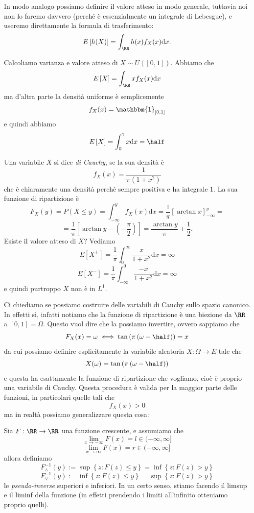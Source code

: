 \documentclass[11pt]{scrartcl}
\newcommand{\dif}{\text{d}}
\begin{document}
	In modo analogo possiamo definire il valore atteso in modo generale, tuttavia noi non lo faremo davvero (perché è essenzialmente un integrale di Lebesgue), e useremo direttamente la formula di trasferimento:
	$$E\left[h(X)\right]=\int_\RR h(x)f_X(x)\dif x.$$
	\begin{example}[Uniforme]
		Calcoliamo varianza e valore atteso di $X\sim U([0,1])$. Abbiamo che
		$$E\left[X\right]=\int_\RR xf_X(x)\dif x$$
		ma d'altra parte la densità uniforme è semplicemente
		$$f_X(x)=\mathbbm{1}_{[0,1]}$$
		e quindi abbiamo
		$$E\left[X\right]=\int_0^1 x\dif x=\half$$
	\end{example}
	\begin{example}
		Una variabile $X$ si dice \textit{di Cauchy}, se la sua densità è
		$$f_X(x)=\frac{1}{\pi(1+x^2)}$$
		che è chiaramente una densità perchè sempre positiva e ha integrale $1$. La sua funzione di ripartizione è
		$$F_X(y)=P\left(X\le y\right)=\int_{-\infty}^y f_X(x)\dif x=\frac{1}{\pi}\left[\arctan x\right]_{-\infty}^y=$$
		$$=\frac{1}{\pi}\left[\arctan y-\left(-\frac{\pi}{2}\right)\right]=\frac{\arctan y}{\pi}+\frac{1}{2}.$$
		Esiste il valore atteso di $X$? Vediamo
		$$E[X^+]=\frac{1}{\pi}\int_0^\infty \frac{x}{1+x^2}\dif x=\infty$$
		$$E[X^-]=\frac{1}{\pi}\int_{-\infty}^0 \frac{-x}{1+x^2}\dif x=\infty$$
		e quindi purtroppo $X$ non è in $L^1$.
	\end{example}
	Ci chiediamo se possiamo costruire delle variabili di Cauchy sullo spazio canonico. In effetti sì, infatti notiamo che la funzione di ripartizione è una biezione da $\RR$ a $[0,1]=\Omega$. Questo vuol dire che la possiamo invertire, ovvero sappiamo che 
	$$F_X(x)=\omega \iff \tan\left(\pi\left(\omega-\half\right)\right)=x$$
	da cui possiamo definire esplicitamente la variabile aleatoria $X:\Omega\to E$ tale che
	$$X(\omega)=\tan\left(\pi\left(\omega-\half\right)\right)$$
	e questa ha esattamente la funzione di ripartizione che vogliamo, cioè è proprio una variabile di Cauchy. Questa procedura è valida per la maggior parte delle funzioni, in particolari quelle tali che
	$$f_X(x)>0$$
	ma in realtà possiamo generalizzare questa cosa:
	\begin{definition}
		Sia $F:\RR\to\RR$ una funzione crescente, e assumiamo che
		$$\lim_{x\to-\infty}F(x)=l\in (-\infty,\infty]$$
		$$\lim_{x\to\infty}F(x)=r \in (-\infty,\infty]$$
		allora definiamo
		$$F_{\land}^{-1}(y):=\sup\left\{z:F(z)\le y\right\}=\inf\left\{z:F(z)>y\right\}$$
		$$F_{\lor}^{-1}(y):=\inf\left\{z:F(z)\le y\right\}=\sup\left\{z:F(z)>y\right\}$$
		le \textit{pseudo-inverse} superiori e inferiori. In un certo senso, stiamo facendo il limsup e il liminf della funzione (in effetti prendendo i limiti all'infinito otteniamo proprio quelli). 
	\end{definition}
\end{document}
